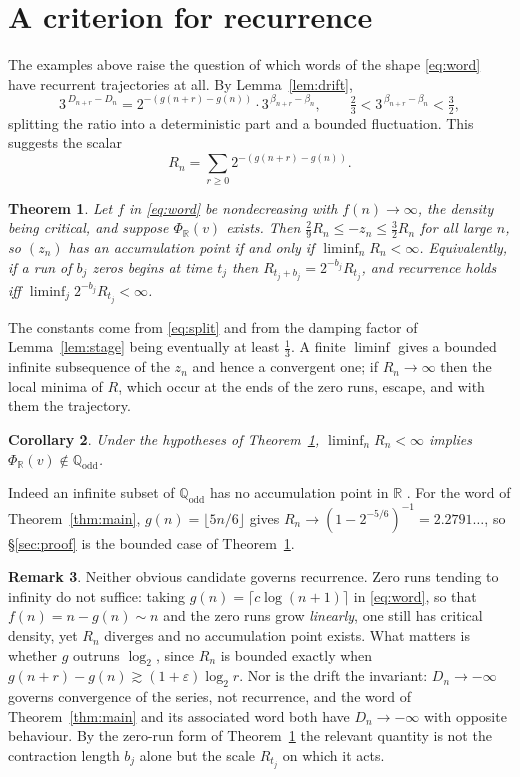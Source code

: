 \documentclass[11pt,a4paper]{article}
\theoremstyle{plain}
\newtheorem{theorem}{Theorem}
\newtheorem{corollary}[theorem]{Corollary}
\theoremstyle{definition}
\newtheorem{remark}[theorem]{Remark}
\newcommand{\R}{\mathbb{R}}
\newcommand{\Qodd}{\mathbb{Q}_{\mathrm{odd}}}
\begin{document}
\section{A criterion for recurrence}\label{sec:crit}

The examples above raise the question of which words of the shape \eqref{eq:word} have recurrent
trajectories at all. By Lemma~\ref{lem:drift},
\begin{equation}\label{eq:split}
   3^{\,D_{n+r}-D_n}=2^{-(g(n+r)-g(n))}\cdot3^{\,\beta_{n+r}-\beta_n},
   \qquad \tfrac23<3^{\,\beta_{n+r}-\beta_n}<\tfrac32 ,
\end{equation}
splitting the ratio into a deterministic part and a bounded fluctuation. This suggests the scalar
\[
   R_n=\sum_{r\ge0}2^{-(g(n+r)-g(n))}.
\]

\begin{theorem}\label{thm:Rn}
Let $f$ in \eqref{eq:word} be nondecreasing with $f(n)\to\infty$, the density being critical, and
suppose $\Phi_\R(v)$ exists. Then $\tfrac29R_n\le-z_n\le\tfrac32R_n$ for all large $n$, so
$(z_n)$ has an accumulation point if and only if $\liminf_nR_n<\infty$. Equivalently, if a run of
$b_j$ zeros begins at time $t_j$ then $R_{t_j+b_j}=2^{-b_j}R_{t_j}$, and recurrence holds iff
$\liminf_j2^{-b_j}R_{t_j}<\infty$.
\end{theorem}

The constants come from \eqref{eq:split} and from the damping factor of Lemma~\ref{lem:stage} being
eventually at least $\tfrac13$. A finite $\liminf$ gives a bounded infinite subsequence of the
$z_n$ and hence a convergent one; if $R_n\to\infty$ then the local minima of $R$, which occur at the
ends of the zero runs, escape, and with them the trajectory.

\begin{corollary}\label{cor:irr}
Under the hypotheses of Theorem~\ref{thm:Rn}, $\liminf_nR_n<\infty$ implies $\Phi_\R(v)\notin\Qodd$.
\end{corollary}

Indeed an infinite subset of $\Qodd$ has no accumulation point in $\R$ \cite[p.~3]{LS}. For the word
of Theorem~\ref{thm:main}, $g(n)=\lfloor5n/6\rfloor$ gives $R_n\to(1-2^{-5/6})^{-1}=2.2791\ldots$,
so \S\ref{sec:proof} is the bounded case of Theorem~\ref{thm:Rn}.

\begin{remark}\label{rem:counter}
Neither obvious candidate governs recurrence. Zero runs tending to infinity do not suffice: taking
$g(n)=\lceil c\log(n+1)\rceil$ in \eqref{eq:word}, so that $f(n)=n-g(n)\sim n$ and the zero runs grow
\emph{linearly}, one still has critical density, yet $R_n$ diverges and no accumulation point exists.
What matters is whether $g$ outruns $\log_2$, since $R_n$ is bounded exactly when
$g(n+r)-g(n)\gtrsim(1+\varepsilon)\log_2r$. Nor is the drift the invariant: $D_n\to-\infty$ governs
convergence of the series, not recurrence, and the word of Theorem~\ref{thm:main} and its associated
word \cite[Example 7]{LS} both have $D_n\to-\infty$ with opposite behaviour. By the zero-run form of
Theorem~\ref{thm:Rn} the relevant quantity is not the contraction length $b_j$ alone but the scale
$R_{t_j}$ on which it acts.
\end{remark}
\end{document}
